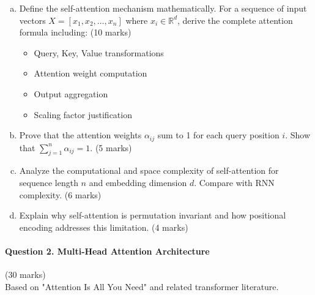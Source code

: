 \documentclass[12pt]{article}
\newcommand{\shortanswer}{\vspace{2cm}}
\newcommand{\mediumanswer}{\vspace{3cm}}
\newcommand{\journalspace}{\vspace{4.5cm}}
\begin{document}
\begin{enumerate}[(a)]
    \item Define the self-attention mechanism mathematically. For a sequence of input vectors $X = [x_1, x_2, ..., x_n]$ where $x_i \in \mathbb{R}^d$, derive the complete attention formula including: \hfill (10 marks)
    \begin{itemize}
        \item Query, Key, Value transformations
        \item Attention weight computation
        \item Output aggregation
        \item Scaling factor justification
    \end{itemize}
    
    \journalspace
    
    \item Prove that the attention weights $\alpha_{ij}$ sum to 1 for each query position $i$. Show that $\sum_{j=1}^n \alpha_{ij} = 1$. \hfill (5 marks)
    
    \mediumanswer
    
    \item Analyze the computational and space complexity of self-attention for sequence length $n$ and embedding dimension $d$. Compare with RNN complexity. \hfill (6 marks)
    
    \mediumanswer
    
    \item Explain why self-attention is permutation invariant and how positional encoding addresses this limitation. \hfill (4 marks)
    
    \shortanswer
\end{enumerate}

\newpage
\paragraph{Question 2. Multi-Head Attention Architecture}\hfill (30 marks)\\
Based on "Attention Is All You Need" and related transformer literature.
\end{document}
